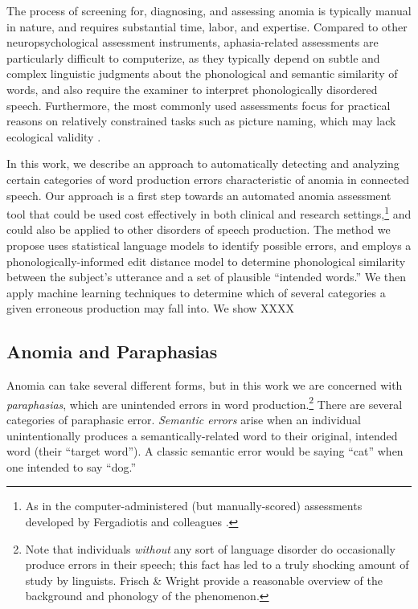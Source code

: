\documentclass[11pt,letterpaper]{article}
\begin{document}
The process of screening for, diagnosing, and assessing anomia is typically manual in nature, and requires substantial time, labor, and expertise.
Compared to other neuropsychological assessment instruments, aphasia-related assessments are particularly difficult to computerize, as they typically depend on subtle and complex linguistic judgments about the phonological and semantic similarity of words, and also require the examiner to interpret phonologically disordered speech.
Furthermore, the most commonly used assessments focus for practical reasons on relatively constrained tasks such as picture naming, which may lack ecological validity \cite{Mayer:2003kp}.

In this work, we describe an approach to automatically detecting and analyzing certain categories of word production errors characteristic of anomia in connected speech.
Our approach is a first step towards an automated anomia assessment tool that could be used cost effectively in both clinical and research settings,\footnote{As in the computer-administered (but manually-scored) assessments developed by Fergadiotis and colleagues \cite{Fergadiotis:2015gp,Hula:2015kz}. } and could also be applied to other disorders of speech production.
The method we propose uses statistical language models to identify possible errors, and employs a phonologically-informed edit distance model to determine phonological similarity between the subject's utterance and a set of plausible ``intended words.''
We then apply machine learning techniques to determine which of several categories a given erroneous production may fall into.
We show XXXX %

\subsection{Anomia and Paraphasias} %
\label{sub:anomia_and_paraphasias}


Anomia can take several different forms, but in this work we are concerned with \emph{paraphasias},
which are unintended errors in word production.\footnote{Note that individuals \emph{without} any sort of language disorder do occasionally produce errors in their speech; this fact has led to a truly shocking amount of study by linguists.
Frisch \& Wright  provide a reasonable overview of the background and phonology of the phenomenon.} %
There are several categories of paraphasic error. \emph{Semantic errors} arise when an individual unintentionally produces a semantically-related word to their original, intended word (their ``target word'').
A classic semantic error would be saying ``cat'' when one intended to say ``dog.''
\end{document}
